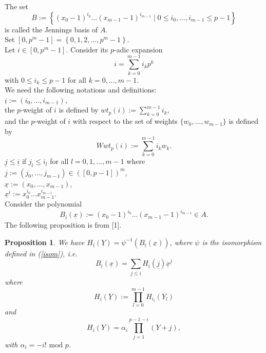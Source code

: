 \documentclass{article}
\theoremstyle{plain}
\newtheorem{prop}[thm]{Proposition}
\theoremstyle{definition}
\begin{document}
The set
\begin{equation}
B:=\left\{(x_{0}-1)^{i_{0}}\ldots (x_{m-1}-1)^{i_{m-1}} \mid 0\leq i_{0},\ldots,i_{m-1}\leq p-1\right\}
\end{equation}
is called the Jennings basis of $A$.\\
Set $\left[0,p^m-1\right]=\left\{0,1,2,\ldots ,p^m-1\right\}$.\\
Let $i\in \left[0,p^m-1\right]$. Consider its $p$-adic expansion
\begin{equation*}
i=\sum_{k=0}^{m-1}i_{k}p^{k}
\end{equation*}
with $0\leq i_{k}\leq p-1$ for all $k=0,\ldots ,m-1$.\\
We need the following notations and definitions:\\
$\underline{i}:=(i_{0},\ldots,i_{m-1})$,\\
the $p$-weight of $i$ is defined by $wt_{p}(i):=\sum_{k=0}^{m-1}i_{k}$,\\
and the $p$-weight of $i$ with respect to the set of weights $\{w_{0},\ldots ,w_{m-1}\}$ is defined by
\begin{equation}
Wwt_{p}(i):=\sum_{k=0}^{m-1}i_{k}w_{k}.
\end{equation}
$\underline{j}\leq\underline{i}$ if $j_{l}\leq i_{l}$ for all $l=0,1,\ldots ,m-1$ where $\underline{j}:=(j_{0},\ldots,j_{m-1})\in ([0,p-1])^{m}$,\\
$\underline{x}:=(x_{0},\ldots,x_{m-1})$,\\
$\underline{x}^{\underline{i}}:=x_0^{i_0}\ldots x_{m-1}^{i_{m-1}}$.\\
\noindent Consider the polynomial
\begin{equation}\label{jennpoly}
B_{\underline{i}}(\underline{x}):=(x_{0}-1)^{i_0}\ldots (x_{m-1}-1)^{i_{m-1}} \in A.
\end{equation}
The following proposition is from [1].
\begin{prop}\label{jenpol}
We have $H_{\underline{i}}(\underline{Y})=\psi^{-1}(B_{\underline{i}}(\underline{x}))$, where $\psi$ is the isomorphism defined in (\ref{isom}), i.e.
\begin{equation*}
B_{\underline{i}}(\underline{x})=\sum_{\underline{j}\leq \underline{i}}H_{\underline{i}}(\underline{j})\underline{x}^{\underline{j}}
\end{equation*}
where
\begin{equation*}\label{prodinterpf}
H_{\underline{i}}(\underline{Y}):=\prod_{l=0}^{m-1}H_{i_l}(Y_l)
\end{equation*}
and
\begin{equation*}
H_i(Y) = \alpha_i \prod_{j=1}^{p-1-i} (Y+j),
\end{equation*}
with $\alpha_i = - i! \mbox{ mod } p$.
\end{prop}
\end{document}
